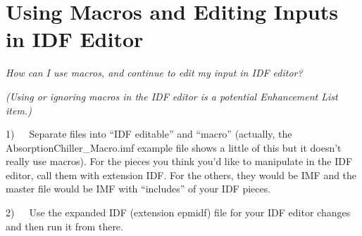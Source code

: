 \section{Using Macros and Editing Inputs in IDF Editor}\label{using-macros-and-editing-inputs-in-idf-editor}

\emph{How can I use macros, and continue to edit my input in IDF editor?}

\emph{(Using or ignoring macros in the IDF editor is a potential Enhancement List item.)}

1)~~~Separate files into ``IDF editable'' and ``macro'' (actually, the AbsorptionChiller\_Macro.imf example file shows a little of this but it doesn't really use macros). For the pieces you think you'd like to manipulate in the IDF editor, call them with extension IDF. For the others, they would be IMF and the master file would be IMF with ``includes'' of your IDF pieces.

2)~~~Use the expanded IDF (extension epmidf) file for your IDF editor changes and then run it from there.
